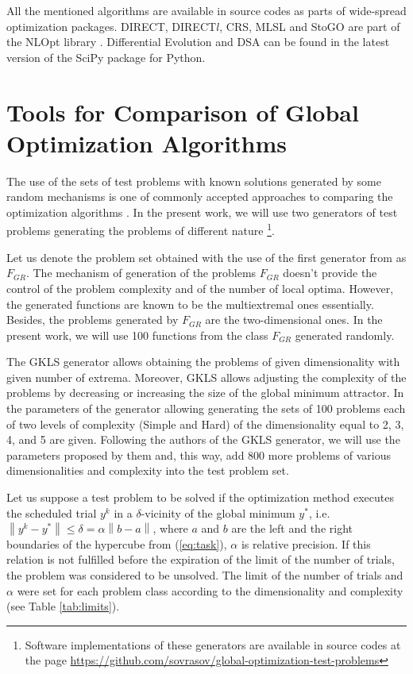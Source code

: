 \documentclass[runningheads]{llncs}
\begin{document}
All the mentioned algorithms are available in source codes as parts of wide-spread optimization packages.
DIRECT, DIRECT$l$, CRS, MLSL and StoGO are part of the NLOpt library \cite{nlopt}.
Differential Evolution and DSA can be found in
the latest version of the SciPy \cite{scipy} package for Python.

\section{Tools for Comparison of Global Optimization Algorithms}

The use of the sets of test problems with known solutions generated by some random mechanisms is
one of commonly accepted approaches to comparing the optimization algorithms
\cite{Beiranvand2017}. In the present work, we will use two generators of test problems generating
the problems of different nature \cite{grishaginClass, Gaviano2003} \footnote{Software implementations of
these generators are available in source codes at the page \url{https://github.com/sovrasov/global-optimization-test-problems}}.

Let us denote the problem set obtained with the use of the first generator from \cite{grishaginClass}
as \(F_{GR}\). The mechanism of generation of the problems \(F_{GR}\) doesn't provide the
control of the problem complexity and of the number of local optima. However, the generated
functions are known to be the multiextremal ones essentially. Besides, the problems generated by
\(F_{GR}\) are the two-dimensional ones. In the present work, we will use 100 functions from the
class \(F_{GR}\) generated randomly.

The GKLS generator \cite{Gaviano2003} allows obtaining the problems of given dimensionality
with given number of extrema. Moreover, GKLS allows adjusting the complexity of the problems by
decreasing or increasing the size of the global minimum attractor. In
\cite{SergeyevKvasov2006} the parameters of the generator allowing generating the sets of 100
problems each of two levels of complexity (Simple and Hard) of the dimensionality equal to 2, 3, 4,
and 5 are given. Following the authors of the GKLS generator, we will use the parameters proposed
by them and, this way, add 800 more problems of various dimensionalities and complexity into the
test problem set.

Let us suppose a test problem to be solved if the optimization method executes the scheduled trial
\(y^k\) in a \(\delta\)-vicinity of the global minimum \(y^*\), i.e. $\left\|y^k-y^*\right\|\leq \delta
= \alpha\left\|b-a\right\|$, where \(a\) and \(b\) are the left and the right boundaries of the hypercube
from (\ref{eq:task}), $\alpha$ is relative precision. If this relation is not fulfilled before the expiration of the limit of the number of
trials, the problem was considered to be unsolved. The limit of the number of trials and $\alpha$ were set
for each problem class according to the dimensionality and complexity (see Table \ref{tab:limits}).
\end{document}
